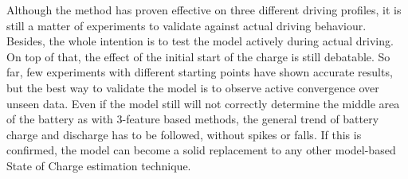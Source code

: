 
%
Although the method has proven effective on three different driving profiles, it is still a matter of experiments to validate against actual driving behaviour.
Besides, the whole intention is to test the model actively during actual driving.
On top of that, the effect of the initial start of the charge is still debatable.
So far, few experiments with different starting points have shown accurate results, but the best way to validate the model is to observe active convergence over unseen data.
Even if the model still will not correctly determine the middle area of the battery as with 3-feature based methods, the general trend of battery charge and discharge has to be followed, without spikes or falls.
If this is confirmed, the model can become a solid replacement to any other model-based State of Charge estimation technique.
